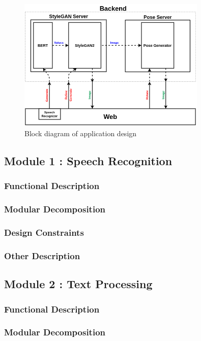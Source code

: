 \begin{figure}[h]
    \centering
    \includegraphics[width=0.8\textwidth]{images/app-design.png}
    \caption{Block diagram of application design}
    \label{fig:system}
\end{figure}

\subsection{Module 1 : Speech Recognition}
\subsubsection{Functional Description}
\subsubsection{Modular Decomposition}
\subsubsection{Design Constraints}
\subsubsection{Other Description}

\subsection{Module 2 : Text Processing}
\subsubsection{Functional Description}
\subsubsection{Modular Decomposition}

